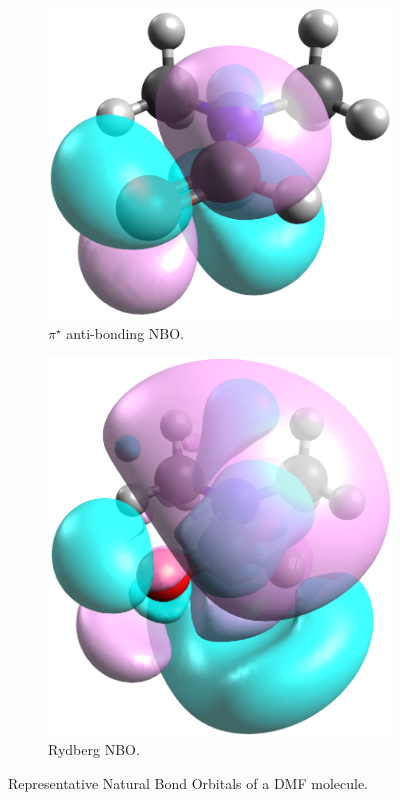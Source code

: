 \begin{refsection}
\begin{figure}
\begin{subfigure}{0.3\linewidth}
        \includegraphics[width=0.8\linewidth]{Figures/dmfnbo-pistar.png}
        \caption{$ \pi^{\star} $ anti-bonding NBO.}
    \end{subfigure}

    \begin{subfigure}{0.3\linewidth}
        \includegraphics[width=0.8\linewidth]{Figures/dmfnbo-rydberg.png}
        \caption{Rydberg NBO.}
    \end{subfigure}
    \caption{Representative Natural Bond Orbitals of a DMF molecule.}\label{fig:nbos}
\end{figure}


\end{refsection}
